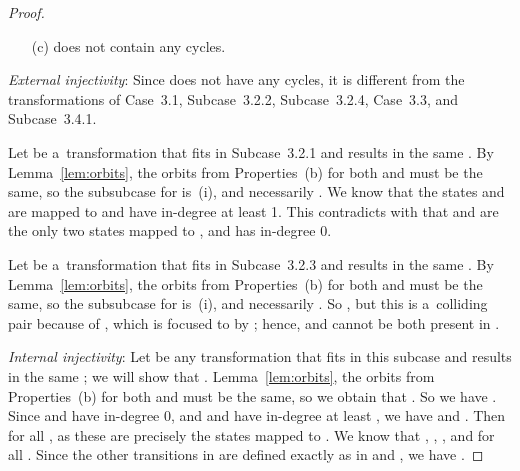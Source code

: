 \documentclass{amsart}
\begin{document}
\begin{proof}
\begin{enumerate}
\item[(c)]  does not contain any cycles.
\end{enumerate}

\textit{External injectivity}:
Since  does not have any cycles, it is different from the transformations of Case~3.1, Subcase~3.2.2, Subcase~3.2.4, Case~3.3, and Subcase~3.4.1.

Let  be a~transformation that fits in Subcase~3.2.1 and results in the same .
By Lemma~\ref{lem:orbits}, the orbits from Properties~(b) for both  and  must be the same, so the subsubcase for  is~(i), and necessarily .
We know that the states  and  are mapped to  and have in-degree at least 1.
This contradicts with that  and  are the only two states mapped to , and  has in-degree 0.

Let  be a~transformation that fits in Subcase~3.2.3 and results in the same .
By Lemma~\ref{lem:orbits}, the orbits from Properties~(b) for both  and  must be the same, so the subsubcase for  is~(i), and necessarily .
So , but this is a~colliding pair because of , which is focused to  by ; hence,  and  cannot be both present in .

\textit{Internal injectivity}:
Let  be any transformation that fits in this subcase and results in the same ; we will show that .
Lemma~\ref{lem:orbits}, the orbits from Properties~(b) for both  and  must be the same, so we obtain that .
So we have .
Since  and  have in-degree 0, and  and  have in-degree at least , we have  and .
Then  for all , as these are precisely the states mapped to .
We know that , , , and  for all .
Since the other transitions in  are defined exactly as in  and , we have .


\end{proof}
\end{document}

